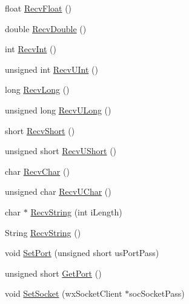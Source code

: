 \begin{DoxyCompactItemize}
float \hyperlink{class_rad_jav_1_1_networking_1_1wx_widgets_t_c_p_client_aefe278a75a95685f1fb6bc46079812dc}{Recv\+Float} ()
\item 
double \hyperlink{class_rad_jav_1_1_networking_1_1wx_widgets_t_c_p_client_a7b9a5feffb3a1b97302d2c51d403540d}{Recv\+Double} ()
\item 
int \hyperlink{class_rad_jav_1_1_networking_1_1wx_widgets_t_c_p_client_ac9aa680c6380c42d8884b3ba2306e4bf}{Recv\+Int} ()
\item 
unsigned int \hyperlink{class_rad_jav_1_1_networking_1_1wx_widgets_t_c_p_client_a0984374ffea572ffd6d3b59894d2fe9f}{Recv\+U\+Int} ()
\item 
long \hyperlink{class_rad_jav_1_1_networking_1_1wx_widgets_t_c_p_client_ae02abe522b1ebe50ef64554969e0e4ab}{Recv\+Long} ()
\item 
unsigned long \hyperlink{class_rad_jav_1_1_networking_1_1wx_widgets_t_c_p_client_abaf77c2bee8db0f50efbc1096d8aa426}{Recv\+U\+Long} ()
\item 
short \hyperlink{class_rad_jav_1_1_networking_1_1wx_widgets_t_c_p_client_a7ad4f5c5524dcbf0d4cdb8f9c8f9f561}{Recv\+Short} ()
\item 
unsigned short \hyperlink{class_rad_jav_1_1_networking_1_1wx_widgets_t_c_p_client_ab508f9e5043b5c5b91fe0342dd2c73a0}{Recv\+U\+Short} ()
\item 
char \hyperlink{class_rad_jav_1_1_networking_1_1wx_widgets_t_c_p_client_a434684834eb01debc6ecc449f0f4cf6d}{Recv\+Char} ()
\item 
unsigned char \hyperlink{class_rad_jav_1_1_networking_1_1wx_widgets_t_c_p_client_a1e0e2b88ff836cf00d918b027187ce25}{Recv\+U\+Char} ()
\item 
char $\ast$ \hyperlink{class_rad_jav_1_1_networking_1_1wx_widgets_t_c_p_client_aab44ec3279a5dab1a95148655f564d55}{Recv\+String} (int i\+Length)
\item 
String \hyperlink{class_rad_jav_1_1_networking_1_1wx_widgets_t_c_p_client_a86ffe1cb21ad3951e233a8db3b33415a}{Recv\+String} ()
\item 
void \hyperlink{class_rad_jav_1_1_networking_1_1wx_widgets_t_c_p_client_a127269099db8fdfff8930044a7478b60}{Set\+Port} (unsigned short us\+Port\+Pass)
\item 
unsigned short \hyperlink{class_rad_jav_1_1_networking_1_1wx_widgets_t_c_p_client_af972313ca0f1e953dccfcc41d01adb4e}{Get\+Port} ()
\item 
void \hyperlink{class_rad_jav_1_1_networking_1_1wx_widgets_t_c_p_client_ad1412665aedcbd85062fee6a0db3a3f5}{Set\+Socket} (wx\+Socket\+Client $\ast$soc\+Socket\+Pass)

\end{DoxyCompactItemize}
